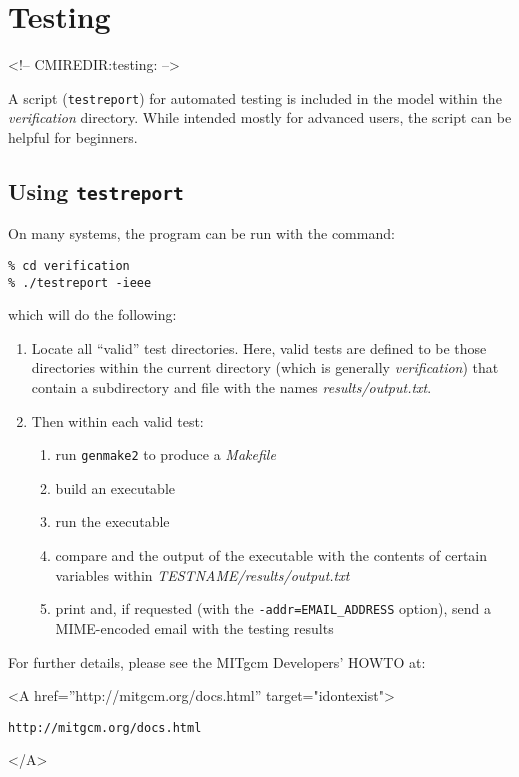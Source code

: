 
\section{Testing}
\label{sect:testing}
\label{www:testing}
\begin{rawhtml}
<!-- CMIREDIR:testing: -->
\end{rawhtml}

A script (\texttt{testreport}) for automated testing is included in
the model within the {\em verification} directory.  While intended
mostly for advanced users, the script can be helpful for beginners.

\subsection{Using \texttt{testreport}}

On many systems, the program can be run with the command:
\begin{verbatim}
% cd verification
% ./testreport -ieee
\end{verbatim}
which will do the following:
\begin{enumerate}
\item Locate all ``valid'' test directories.  Here, valid tests are
  defined to be those directories within the current directory (which
  is generally {\em verification}) that contain a subdirectory and
  file with the names {\em results/output.txt}.

\item Then within each valid test:
  \begin{enumerate}
  \item run \texttt{genmake2} to produce a {\em Makefile}
  \item build an executable
  \item run the executable
  \item compare and the output of the executable with the
    contents of certain variables within {\em
      TESTNAME/results/output.txt}
  \item print and, if requested (with the
    \texttt{-addr=EMAIL\_ADDRESS} option), send a MIME-encoded email
    with the testing results
  \end{enumerate}

\end{enumerate}

For further details, please see the MITgcm Developers' HOWTO at:
\begin{rawhtml} <A href=''http://mitgcm.org/docs.html'' target="idontexist"> \end{rawhtml}
\begin{verbatim}
http://mitgcm.org/docs.html
\end{verbatim}
\begin{rawhtml} </A> \end{rawhtml}


